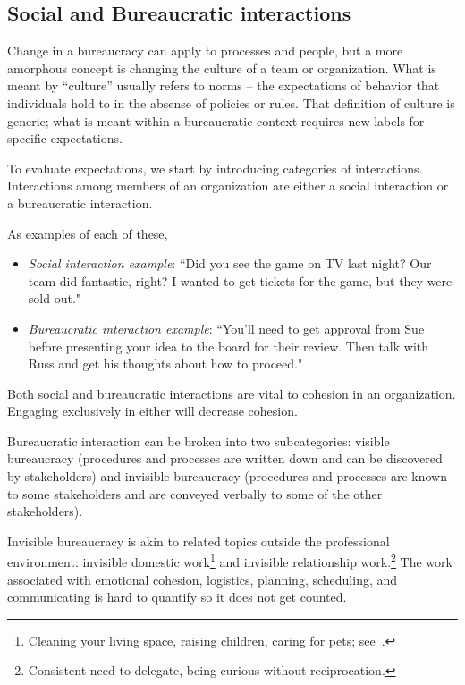 
\subsection*{Social and Bureaucratic interactions\label{sec:socializing}}

Change in a bureaucracy can apply to processes and people, but a more amorphous concept is changing the culture of a team or organization. What is meant by ``culture'' usually refers to norms -- the expectations of behavior that individuals hold to in the absense of policies or rules. That definition of culture is generic; what is meant within a bureaucratic context requires new labels for specific expectations.

To evaluate expectations, we start by introducing categories of interactions. 
Interactions among members of an organization are either a social interaction or a bureaucratic interaction. 

As examples of each of these,
\begin{itemize}
\item \textit{Social interaction example}: ``Did you see the game on TV last night? Our team did fantastic, right? I wanted to get tickets for the game, but they were sold out."
\item \textit{Bureaucratic interaction example}: ``You'll need to get approval from Sue before presenting your idea to the board for their review. Then talk with Russ and get his thoughts about how to proceed."
\end{itemize}
Both social and bureaucratic interactions are vital to cohesion in an organization. Engaging exclusively in either will decrease cohesion.


Bureaucratic interaction can be broken into two subcategories: 
\gls{visible bureaucracy} \iftoggle{glossaryinmargin}{\marginpar{[Glossary]}}{}%
(procedures and processes are written down and can be discovered by stakeholders) and 
\gls{invisible bureaucracy} \iftoggle{glossaryinmargin}{\marginpar{[Glossary]}}{}%
(procedures and processes are known to some stakeholders and are conveyed verbally to some of the other stakeholders).

Invisible bureaucracy is akin to related topics outside the professional environment: invisible domestic work\footnote{Cleaning your living space, raising children, caring for pets; see~\cite{1987_Daniels}.} and invisible relationship work.\footnote{Consistent need to delegate, being curious without reciprocation.} The work associated with emotional cohesion, logistics, planning, scheduling, and communicating is hard to quantify so it does not get counted.


